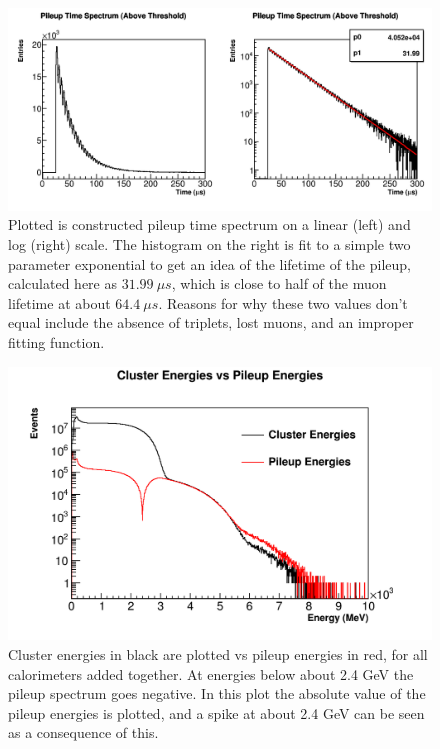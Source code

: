 	\begin{figure}[]
		\centering
		\includegraphics[width=\textwidth]{PileupTimeSpectrum}
	    \caption[PileupTimeSpectrum]{Plotted is constructed pileup time spectrum on a linear (left) and log (right) scale. The histogram on the right is fit to a simple two parameter exponential to get an idea of the lifetime of the pileup, calculated here as $\SI{31.99}{\mu s}$, which is close to half of the muon lifetime at about $\SI{64.4}{\mu s}$. Reasons for why these two values don't equal include the absence of triplets, lost muons, and an improper fitting function.}
	    \label{fig:PileupTimeSpectrum}
	\end{figure}

	\begin{figure}[]
		\centering
		\includegraphics[width=\textwidth]{ClusterEnergiesVsPileupEnergies}
	    \caption[ClusterEnergiesVsPileupEnergies]{Cluster energies in black are plotted vs pileup energies in red, for all calorimeters added together. At energies below about 2.4 GeV the pileup spectrum goes negative. In this plot the absolute value of the pileup energies is plotted, and a spike at about 2.4 GeV can be seen as a consequence of this.}    
	    \label{fig:ClusterEnergiesVsPileupEnergies}
	\end{figure}

